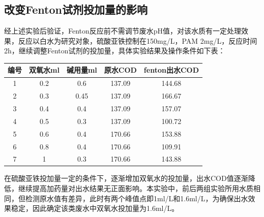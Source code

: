 \subsection{改变Fenton试剂投加量的影响}
经上述实验后验证，Fenton反应前不需调节废水pH值，对该水质有一定处理效果，反应以白水为研究对象，硫酸亚铁控制在150mg/L，PAM 2mg/L，反应时间2h，继续调整Fenton试剂的投加量，具体实验结果及操作条件如下表：\par
\begin{center}
\label{tab4}
\begin{tabular}{| c | c | c | c | c |}
    \hline
    编号 & 双氧水ml & 碱用量ml & 原水COD & fenton出水COD\\ \hline 
    1 & 0.2 & 0.6 & 137.09 & 144.68\\ \hline 
    2 & 0.3 & 0.45 & 137.09 & 166.67\\ \hline 
    3 & 0.4 & 0.4 & 137.09 & 157.07\\ \hline 
    4 & 0.5 & 0.3 & 137.09 & 100.72\\ \hline 
    5 & 0.6 & 0.4 & 170.66 & 153.88\\ \hline 
    6 & 0.8 & 0.4 & 170.66 & 109.91\\ \hline 
    7 & 1 & 0.3 & 170.66 & 143.88\\ \hline 
\end{tabular}
\end{center}
\setlength{\parindent}{2em}
\par
在硫酸亚铁投加量一定的条件下，逐渐增加双氧水的投加量，出水COD值逐渐降低，继续提高加药量对出水结果无正面影响。本实验中，前后两组实验所用水质相同，但检测原水值有差异，此时有两个峰值点即1ml/L和1.6ml/L，为确保出水效果稳定，因此确定该类废水中双氧水投加量为1.6ml/L。\par
